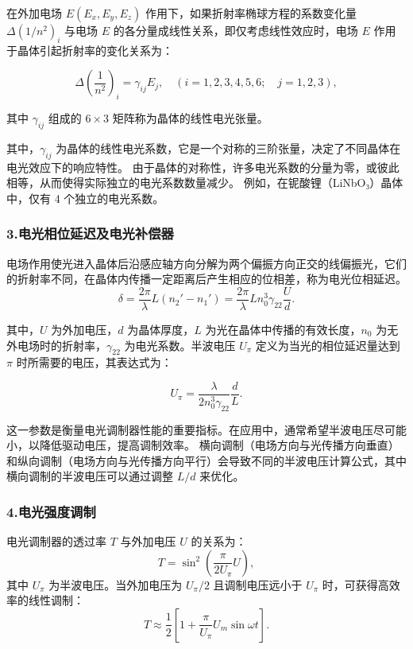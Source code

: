 \documentclass[12pt,a4paper,UTF8]{ctexart}
\begin{document}
	在外加电场 $E(E_x, E_y, E_z)$ 作用下，如果折射率椭球方程的系数变化量 $\Delta (1/n^2)_i$ 与电场 $E$ 的各分量成线性关系，即仅考虑线性效应时，电场 $E$ 作用于晶体引起折射率的变化关系为：
	
	\begin{equation}
	    \Delta \left( \frac{1}{n^2} \right)_i = \gamma_{ij} E_j, \quad (i = 1,2,3,4,5,6; \quad j = 1,2,3),
	\end{equation}
	
	其中 $\gamma_{ij}$ 组成的 $6\times3$ 矩阵称为晶体的线性电光张量。

	其中，$\gamma_{ij}$ 为晶体的线性电光系数，它是一个对称的三阶张量，决定了不同晶体在电光效应下的响应特性。
	由于晶体的对称性，许多电光系数的分量为零，或彼此相等，从而使得实际独立的电光系数数量减少。
	例如，在铌酸锂（LiNbO₃）晶体中，仅有 4 个独立的电光系数。

	
\subsubsection*{3.电光相位延迟及电光补偿器}
	电场作用使光进入晶体后沿感应轴方向分解为两个偏振方向正交的线偏振光，它们的折射率不同，在晶体内传播一定距离后产生相应的位相差，称为电光位相延迟。
	\begin{equation}
	    \delta = \frac{2\pi}{\lambda} L (n_2' - n_1') = \frac{2\pi}{\lambda} L n_0^3 \gamma_{22} \frac{U}{d}.
	\end{equation}
	
	其中，$U$ 为外加电压，$d$ 为晶体厚度，$L$ 为光在晶体中传播的有效长度，$n_0$ 为无外电场时的折射率，$\gamma_{22}$ 为电光系数。半波电压 $U_\pi$ 定义为当光的相位延迟量达到 $\pi$ 时所需要的电压，其表达式为：
	
	\begin{equation}
    U_\pi = \frac{\lambda}{2 n_0^3 \gamma_{22}} \frac{d}{L}.
	\end{equation}

	这一参数是衡量电光调制器性能的重要指标。在应用中，通常希望半波电压尽可能小，以降低驱动电压，提高调制效率。
	横向调制（电场方向与光传播方向垂直）和纵向调制（电场方向与光传播方向平行）会导致不同的半波电压计算公式，其中横向调制的半波电压可以通过调整 $L/d$ 来优化。


\subsubsection*{4.电光强度调制}
	电光调制器的透过率 $T$ 与外加电压 $U$ 的关系为：
	\begin{equation}
		T = \sin^2 \left( \frac{\pi}{2U_\pi} U \right),
	\end{equation}
	其中 $U_\pi$ 为半波电压。当外加电压为 $U_\pi/2$ 且调制电压远小于 $U_\pi$ 时，可获得高效率的线性调制：
	\begin{equation}
		T \approx \frac{1}{2} \left[ 1 + \frac{\pi}{U_\pi} U_m \sin \omega t \right].
	\end{equation}
	
\end{document}
